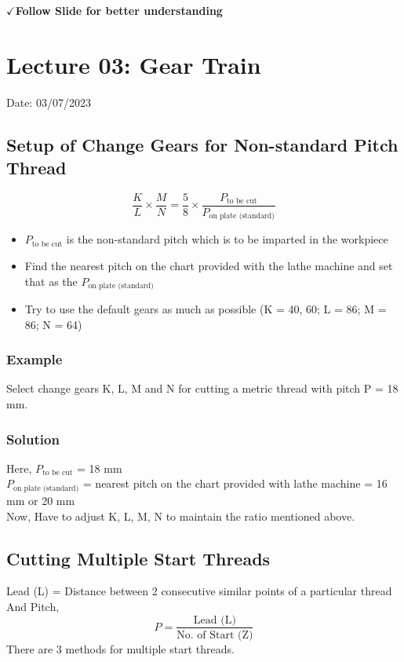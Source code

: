 \documentclass{article}
\begin{document}
$\checkmark $\textbf{Follow Slide for better understanding}
\pagebreak
\section{Lecture 03: Gear Train } 
\hfill Date: 03/07/2023

\subsection*{Setup of Change Gears for Non-standard Pitch Thread}
$$\frac{K}{L} \times \frac{M}{N} = \frac{5}{8} \times \frac{P_{\text{to be cut}}}{P_{\text{on plate (standard)}}} $$

\begin{itemize}
  \item $P_{\text{to be cut}}$ is the non-standard pitch which is to be imparted in the workpiece
  \item Find the nearest pitch on the chart provided with the lathe machine and set that as the $P_{\text{on plate (standard)}}$
  \item Try to use the default gears as much as possible (K = 40, 60; L = 86; M = 86; N = 64)
\end{itemize}

\subsubsection*{Example}
Select change gears K, L, M and N for cutting a metric thread with pitch P = 18 mm.
\subsubsection*{Solution}
Here, $P_{\text{to be cut}}$ = 18 mm \\
$P_{\text{on plate (standard)}}$ = nearest pitch on the chart provided with lathe machine = 16 mm or 20 mm \\
Now, Have to adjust K, L, M, N to maintain the ratio mentioned above.


\subsection*{Cutting Multiple Start Threads}
Lead (L) = Distance between 2 consecutive similar points of a particular thread\\
And Pitch, $$P = \frac{\text{Lead (L)}}{\text{No. of Start (Z)}}$$
There are 3 methods for multiple start threads. \\
\end{document}
